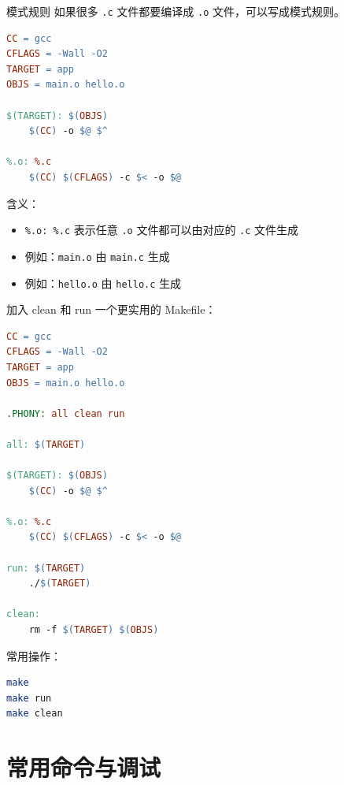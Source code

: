 \documentclass[aspectratio=169]{ctexbeamer}
\begin{document}
\begin{frame}[fragile]{模式规则}
如果很多 \texttt{.c} 文件都要编译成 \texttt{.o} 文件，可以写成模式规则。

\begin{lstlisting}[language=make]
CC = gcc
CFLAGS = -Wall -O2
TARGET = app
OBJS = main.o hello.o

$(TARGET): $(OBJS)
	$(CC) -o $@ $^

%.o: %.c
	$(CC) $(CFLAGS) -c $< -o $@
\end{lstlisting}

含义：

\begin{itemize}
  \item \texttt{\%.o: \%.c} 表示任意 \texttt{.o} 文件都可以由对应的 \texttt{.c} 文件生成
  \item 例如：\texttt{main.o} 由 \texttt{main.c} 生成
  \item 例如：\texttt{hello.o} 由 \texttt{hello.c} 生成
\end{itemize}
\end{frame}

\begin{frame}{加入 clean 和 run}
一个更实用的 Makefile：

\begin{lstlisting}[language=make]
CC = gcc
CFLAGS = -Wall -O2
TARGET = app
OBJS = main.o hello.o

.PHONY: all clean run

all: $(TARGET)

$(TARGET): $(OBJS)
	$(CC) -o $@ $^

%.o: %.c
	$(CC) $(CFLAGS) -c $< -o $@

run: $(TARGET)
	./$(TARGET)

clean:
	rm -f $(TARGET) $(OBJS)
\end{lstlisting}

常用操作：

\begin{lstlisting}[language=bash]
make
make run
make clean
\end{lstlisting}
\end{frame}

\section{常用命令与调试}
\end{document}
